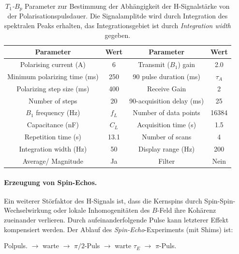 \documentclass[../main.tex]{subfiles}
\begin{document}
         \begin{table}[H]
            \centering
            \begin{tabular}{cc|cc}
                 \textbf{Parameter} & \textbf{Wert} & \textbf{Parameter} & \textbf{Wert}  \\\hline\hline
                Polarising current (\si{\ampere}) & 6 & Transmit ($B_1$) gain & \num{2.0}\\\hline
                Minimum polarizing time (\si{\milli\second}) & 250 & 90 pulse duration (\si{\milli\second}) & $\tau_A$\\\hline 
                Polarizing step size (\si{\milli\second}) & 400 & Receive Gain & 2\\\hline
                Number of steps & 20 & 90-acquisition delay (\si{\milli\second}) & 25\\\hline 
                $B_1$ frequency (\si{\hertz}) & $f_L$ & Number of data points & 16384\\\hline
                Capacitance (\si{\nano\farad}) & $C_L$ & Acquisition time (\si{\second}) & \num{1.5}\\\hline
                Repetition time (\si{\second}) & \num{13.1} & Number of scans & 4\\\hline
                Integration width (\si{\hertz}) & 50 & Display range (\si{\hertz}) & 200\\\hline
                Average/ Magnitude & Ja & Filter & Nein
            \end{tabular}
            \caption{\textit{$T_1$-$B_p$} Parameter zur Bestimmung der Abhängigkeit der H-Signalstärke von der Polarisationspulsdauer. Die Signalamplitde wird durch Integration des spektralen Peaks erhalten, das Integrationsgebiet ist durch \textit{Integration width} gegeben.}
            \label{tab:DurchfuehrungTeil8Parameter}
        \end{table}

    \paragraph{Erzeugung von Spin-Echos.}
        Ein weiterer Störfaktor des H-Signals ist, dass die Kernspins durch Spin-Spin-Wechselwirkung oder lokale Inhomogenitäten des $B$-Feld ihre Kohärenz zueinander verlieren. Durch aufeinanderfolgende Pulse kann letzterer Effekt kompensiert werden.  Der Ablauf des \textit{Spin-Echo}-Experiments (mit Shims) ist:
        \begin{center}
            Polpuls. $\longrightarrow$ warte $\longrightarrow$ $\pi/2$-Puls $\longrightarrow$ warte $\tau_E$ $\longrightarrow$ $\pi$-Puls.
        \end{center}
\end{document}
